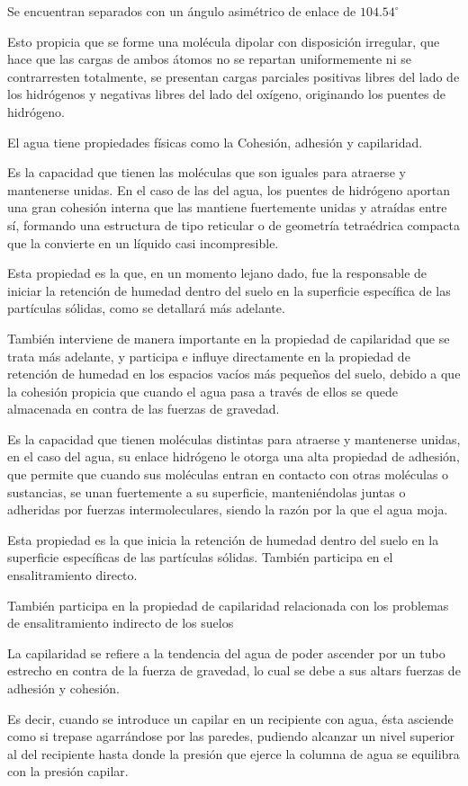     Se encuentran separados con un ángulo asimétrico de enlace de $104.54^{\circ}$
    
    Esto propicia que se forme una molécula dipolar con disposición irregular, que hace que las cargas de ambos átomos no se repartan uniformemente ni se contrarresten totalmente, se presentan cargas parciales positivas libres del lado de los hidrógenos y negativas libres del lado del oxígeno, originando los puentes de hidrógeno.
    
    El agua tiene propiedades físicas como la Cohesión, adhesión y capilaridad.
    
    \begin{definition}[Coehsión]
        Es la capacidad que tienen las moléculas que son iguales para atraerse y mantenerse unidas. En el caso de las del agua, los puentes de hidrógeno aportan una gran cohesión interna que las mantiene fuertemente unidas y atraídas entre sí, formando una estructura de tipo reticular o de geometría tetraédrica compacta que la convierte en un líquido casi incompresible.
    \end{definition}
    Esta propiedad es la que, en un momento lejano dado, fue la responsable de iniciar la retención de humedad dentro del suelo en la superficie específica de las partículas sólidas, como se detallará más adelante.
    
    También interviene de manera importante en la propiedad de capilaridad que se trata más adelante, y participa e influye directamente en la propiedad de retención de humedad en los espacios vacíos más pequeños del suelo, debido a que la cohesión propicia que cuando el agua pasa a través de ellos se quede almacenada en contra de las fuerzas de gravedad.
    \begin{definition}[Adhesión]
        Es la capacidad que tienen moléculas distintas para atraerse y mantenerse unidas, en el caso del agua, su enlace hidrógeno le otorga una alta propiedad de adhesión, que permite que cuando sus moléculas entran en contacto con otras moléculas o sustancias, se unan fuertemente a su superficie, manteniéndolas juntas o adheridas por fuerzas intermoleculares, siendo la razón por la que el agua moja.
    \end{definition}
    Esta propiedad es la que inicia la retención de humedad dentro del suelo en la superficie específicas de las partículas sólidas. También participa en el ensalitramiento directo.

También participa en la propiedad de capilaridad relacionada con los problemas de ensalitramiento indirecto de los suelos
  \begin{definition}[Capilaridad]
      La capilaridad se refiere a la tendencia del agua de poder ascender por un tubo estrecho en contra de la fuerza de gravedad, lo cual se debe a sus altars fuerzas de adhesión y cohesión.
  \end{definition}
Es decir, cuando se introduce un capilar en un recipiente con agua, ésta asciende como si trepase agarrándose por las paredes, pudiendo alcanzar un nivel superior al del recipiente hasta donde la presión que ejerce la columna de agua se equilibra con la presión capilar.

